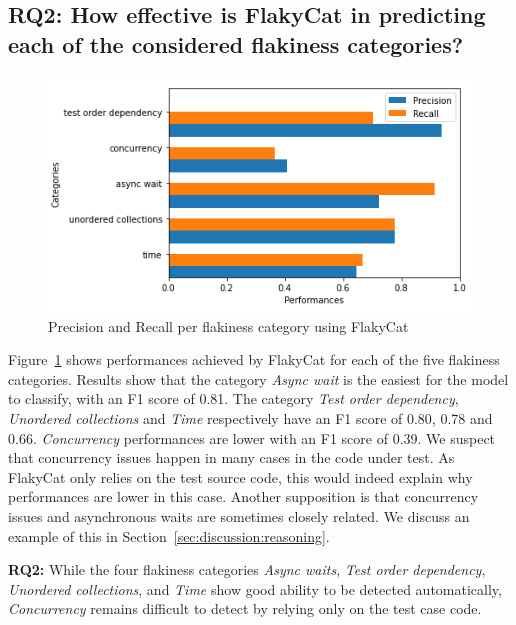 \subsection{RQ2: How effective is FlakyCat in predicting each of the considered flakiness categories?}

\begin{figure}[htbp]
\centering
\includegraphics[scale=0.8]{figures/flakycat/FSL.PNG}
\caption{Precision and Recall per flakiness category using FlakyCat}
\label{fig:FSL}
\end{figure}

Figure~\ref{fig:FSL} shows performances achieved by FlakyCat for each of the five flakiness categories. Results show that the category \textit{Async wait} is the easiest for the model to classify, with an F1 score of 0.81. The category \textit{Test order dependency}, \textit{Unordered collections} and \textit{Time} respectively have an F1 score of 0.80, 0.78 and 0.66. \textit{Concurrency} performances are lower with an F1 score of 0.39. 
We suspect that concurrency issues happen in many cases in the code under test. As FlakyCat only relies on the test source code, this would indeed explain why performances are lower in this case. Another supposition is that concurrency issues and asynchronous waits are sometimes closely related. We discuss an example of this in Section~\ref{sec:discussion:reasoning}. \\

\begin{tcolorbox}[
    left=2pt,right=2pt,top=2pt,bottom=2pt,
    arc=0pt,
    boxrule=1.2pt
]
\textbf{RQ2:} While the four flakiness categories \textit{Async waits}, \textit{Test order dependency}, \textit{Unordered collections},  and \textit{Time} show good ability to be detected automatically, \textit{Concurrency} remains difficult to detect by relying only on the test case code. 

\end{tcolorbox}

